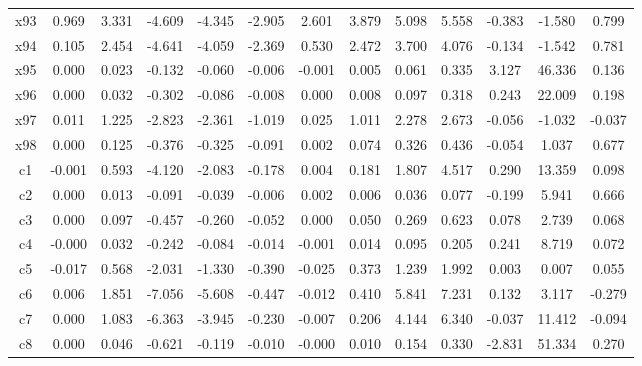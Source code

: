 {\begin{longtable}{@{\extracolsep\fill} ccccccccccccc}
     x93 &  0.969 & 3.331 & -4.609 & -4.345 & -2.905 &  2.601 &  3.879 & 5.098 & 5.558 &    -0.383 &    -1.580 &  0.799 \\
     x94 &  0.105 & 2.454 & -4.641 & -4.059 & -2.369 &  0.530 &  2.472 & 3.700 & 4.076 &    -0.134 &    -1.542 &  0.781 \\
     x95 &  0.000 & 0.023 & -0.132 & -0.060 & -0.006 & -0.001 &  0.005 & 0.061 & 0.335 &     3.127 &    46.336 &  0.136 \\
     x96 &  0.000 & 0.032 & -0.302 & -0.086 & -0.008 &  0.000 &  0.008 & 0.097 & 0.318 &     0.243 &    22.009 &  0.198 \\
     x97 &  0.011 & 1.225 & -2.823 & -2.361 & -1.019 &  0.025 &  1.011 & 2.278 & 2.673 &    -0.056 &    -1.032 & -0.037 \\
     x98 &  0.000 & 0.125 & -0.376 & -0.325 & -0.091 &  0.002 &  0.074 & 0.326 & 0.436 &    -0.054 &     1.037 &  0.677 \\
      c1 & -0.001 & 0.593 & -4.120 & -2.083 & -0.178 &  0.004 &  0.181 & 1.807 & 4.517 &     0.290 &    13.359 &  0.098 \\
      c2 &  0.000 & 0.013 & -0.091 & -0.039 & -0.006 &  0.002 &  0.006 & 0.036 & 0.077 &    -0.199 &     5.941 &  0.666 \\
      c3 &  0.000 & 0.097 & -0.457 & -0.260 & -0.052 &  0.000 &  0.050 & 0.269 & 0.623 &     0.078 &     2.739 &  0.068 \\
      c4 & -0.000 & 0.032 & -0.242 & -0.084 & -0.014 & -0.001 &  0.014 & 0.095 & 0.205 &     0.241 &     8.719 &  0.072 \\
      c5 & -0.017 & 0.568 & -2.031 & -1.330 & -0.390 & -0.025 &  0.373 & 1.239 & 1.992 &     0.003 &     0.007 &  0.055 \\
      c6 &  0.006 & 1.851 & -7.056 & -5.608 & -0.447 & -0.012 &  0.410 & 5.841 & 7.231 &     0.132 &     3.117 & -0.279 \\
      c7 &  0.000 & 1.083 & -6.363 & -3.945 & -0.230 & -0.007 &  0.206 & 4.144 & 6.340 &    -0.037 &    11.412 & -0.094 \\
      c8 &  0.000 & 0.046 & -0.621 & -0.119 & -0.010 & -0.000 &  0.010 & 0.154 & 0.330 &    -2.831 &    51.334 &  0.270 \\
\end{longtable}
}
